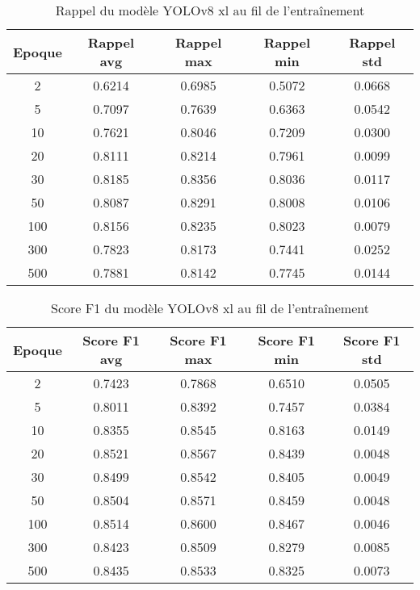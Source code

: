 \begin{table}[!ht]
    \caption{Rappel du modèle YOLOv8 xl au fil de l'entraînement}
    \label{tab:yolov8xl_rappel}
    \centering
    \begin{tabular}{ |c||c|c|c|c|  }
        \hline
        \rowcolor{gray!50}
        Epoque & Rappel avg & Rappel max & Rappel min & Rappel std\\
        \hline
        2 & 0.6214 & 0.6985 & 0.5072 & 0.0668\\
        5 & 0.7097 & 0.7639 & 0.6363 & 0.0542\\
        10 & 0.7621 & 0.8046 & 0.7209 & 0.0300\\
        20 & 0.8111 & 0.8214 & 0.7961 & 0.0099\\
        30 & 0.8185 & 0.8356 & 0.8036 & 0.0117\\
        50 & 0.8087 & 0.8291 & 0.8008 & 0.0106\\
        100 & 0.8156 & 0.8235 & 0.8023 & 0.0079\\
        300 & 0.7823 & 0.8173 & 0.7441 & 0.0252\\
        500 & 0.7881 & 0.8142 & 0.7745 & 0.0144\\
        \hline
    \end{tabular}
\end{table}

\begin{table}[!ht]
    \caption{Score F1 du modèle YOLOv8 xl au fil de l'entraînement}
    \label{tab:yolov8xl_f1score}
    \centering
    \begin{tabular}{ |c||c|c|c|c|  }
        \hline
        \rowcolor{gray!50}
        Epoque & Score F1 avg & Score F1 max & Score F1 min & Score F1 std\\
        \hline
        2 & 0.7423 & 0.7868 & 0.6510 & 0.0505\\
        5 & 0.8011 & 0.8392 & 0.7457 & 0.0384\\
        10 & 0.8355 & 0.8545 & 0.8163 & 0.0149\\
        20 & 0.8521 & 0.8567 & 0.8439 & 0.0048\\
        30 & 0.8499 & 0.8542 & 0.8405 & 0.0049\\
        50 & 0.8504 & 0.8571 & 0.8459 & 0.0048\\
        100 & 0.8514 & 0.8600 & 0.8467 & 0.0046\\
        300 & 0.8423 & 0.8509 & 0.8279 & 0.0085\\
        500 & 0.8435 & 0.8533 & 0.8325 & 0.0073\\
        \hline
    \end{tabular}
\end{table}

